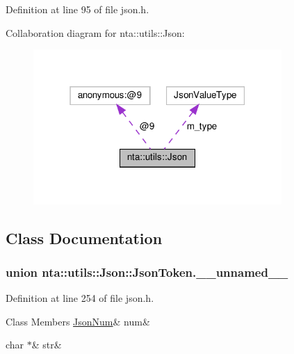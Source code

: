 Definition at line 95 of file json.\+h.



Collaboration diagram for nta\+:\+:utils\+:\+:Json\+:\nopagebreak
\begin{figure}[H]
\begin{center}
\leavevmode
\includegraphics[width=268pt]{d2/de6/classnta_1_1utils_1_1Json__coll__graph}
\end{center}
\end{figure}


\subsection{Class Documentation}
\label{unionnta_1_1utils_1_1Json_1_1JsonToken_8____unnamed____}
\subsubsection{union nta\+:\+:utils\+:\+:Json\+:\+:Json\+Token.\+\_\+\+\_\+unnamed\+\_\+\+\_\+}


Definition at line 254 of file json.\+h.

\begin{DoxyFields}{Class Members}
\mbox{\label{classnta_1_1utils_1_1Json_a0fc3cfbc27e91ea60a787de13dae3e3c}} 
\hyperlink{classnta_1_1utils_1_1JsonNum}{JsonNum}&
num&
\\
\hline

\mbox{\label{classnta_1_1utils_1_1Json_a341be97d9aff90c9978347f66f945b77}} 
char $\ast$&
str&
\\
\hline

\end{DoxyFields}


